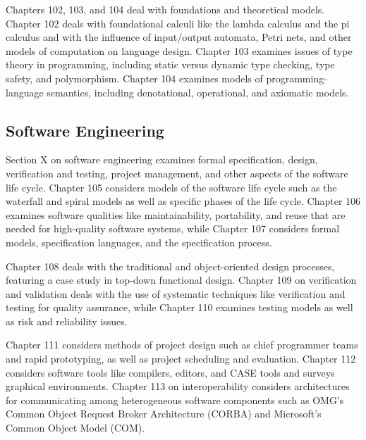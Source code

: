 Chapters 102, 103, and 104 deal with foundations and
theoretical models. Chapter 102 deals with foundational
calculi like the lambda calculus and the pi calculus and with the
influence of input/output automata, Petri nets, and other models
of computation on language design. Chapter 103 examines issues
of type theory in programming, including static versus dynamic
type checking, type safety, and polymorphism. Chapter 104
examines models of programming-language semantics, including
denotational, operational, and axiomatic models.

\subsection{Software Engineering}

Section X on software engineering examines formal specification,
design, verification and testing, project management, and other
aspects of the software life cycle. Chapter 105 considers models
of the software life cycle such as the waterfall and spiral
models as well as specific phases of the life cycle. Chapter
106 examines software qualities like maintainability,
portability, and reuse that are needed for high-quality software
systems, while Chapter 107 considers formal models,
specification languages, and the specification process.

Chapter 108 deals with the traditional and
object-oriented design processes, featuring a case study in
top-down functional design. Chapter 109 on verification and
validation deals with the use of systematic techniques like
verification and testing for quality assurance, while Chapter
110 examines testing models as well as risk and reliability issues.

Chapter 111 considers methods of project design such as chief
programmer teams and rapid prototyping, as well as project
scheduling and evaluation. Chapter 112 considers software tools
like compilers, editors, and CASE tools and surveys graphical
environments. Chapter 113 on interoperability considers
architectures for communicating among heterogeneous software
components such as OMG's Common Object Request Broker
Architecture (CORBA) and Microsoft's Common Object Model (COM).

